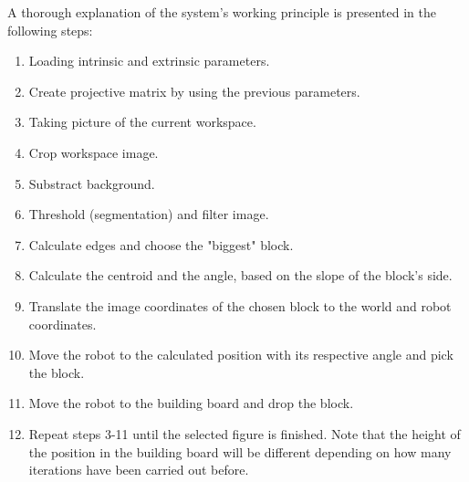 A thorough explanation of the system's working principle is presented in the following steps:   
\begin{enumerate}
	\item Loading intrinsic and extrinsic parameters.
	\item Create projective matrix by using the previous parameters.
	\item Taking picture of the current workspace.
	\item Crop workspace image. 
	\item Substract background.
	\item Threshold (segmentation) and filter image.
	\item Calculate edges and choose the "biggest" block.
	\item Calculate the centroid and the angle, based on the slope of the block's side.
	\item Translate the image coordinates of the chosen block to the world and robot coordinates.
	\item Move the robot to the calculated position with its respective angle and pick the block.
	\item Move the robot to the building board and drop the block.
	\item Repeat steps 3-11 until the selected figure is finished. Note that the height of the position in the building board will be different depending on how many iterations have been carried out before.
\end{enumerate}